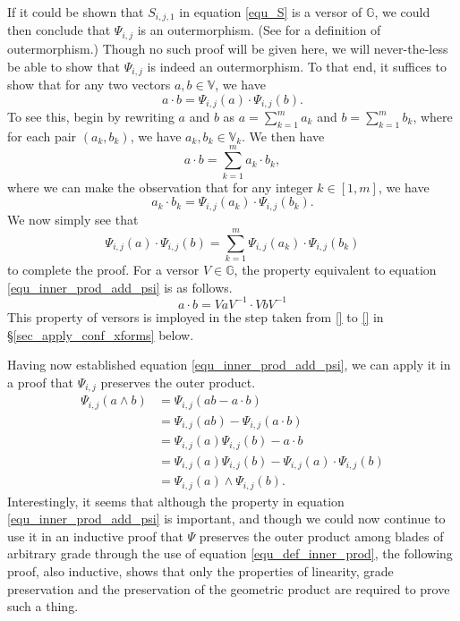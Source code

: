 \documentclass{ecgd-l}
\theoremstyle{definition}
\theoremstyle{remark}
\numberwithin{equation}{section}
\newcommand{\G}{\mathbb{G}}
\newcommand{\V}{\mathbb{V}}
\begin{document}
If it could be shown that $S_{i,j,1}$ in equation \eqref{equ_S} is a versor of $\G$,
we could then conclude that $\Psi_{i,j}$ is an outermorphism.
(See \cite{Hestenes91} for a definition of outermorphism.)  Though no such
proof will be given here, we will never-the-less be able to show that $\Psi_{i,j}$ is indeed
an outermorphism.  To that end, it suffices to show that
for any two vectors $a,b\in\V$, we have
\begin{equation}\label{equ_inner_prod_add_psi}
a\cdot b = \Psi_{i,j}(a)\cdot \Psi_{i,j}(b).
\end{equation}
To see this, begin by rewriting $a$ and $b$ as
$a = \sum_{k=1}^m a_k$ and $b = \sum_{k=1}^m b_k$,
where for each pair $(a_k,b_k)$, we have $a_k,b_k\in\V_k$.  We then have
\begin{equation*}
a\cdot b=\sum_{k=1}^m a_k\cdot b_k,
\end{equation*}
where we can make the observation that for any integer $k\in[1,m]$, we have
\begin{equation*}
a_k\cdot b_k = \Psi_{i,j}(a_k)\cdot\Psi_{i,j}(b_k).
\end{equation*}
We now simply see that
\begin{equation*}
\Psi_{i,j}(a)\cdot\Psi_{i,j}(b)=\sum_{k=1}^m\Psi_{i,j}(a_k)\cdot\Psi_{i,j}(b_k)
\end{equation*}
to complete the proof.  For a versor $V\in\G$, the property equivalent
to equation \eqref{equ_inner_prod_add_psi} is as follows.
\begin{equation*}
a\cdot b = VaV^{-1}\cdot VbV^{-1}
\end{equation*}
This property of versors is imployed in the step taken from \eqref{} to
\eqref{} in \S\ref{sec_apply_conf_xforms} below.

Having now established equation \eqref{equ_inner_prod_add_psi}, we can apply it in
a proof that $\Psi_{i,j}$ preserves the outer product.
\begin{align*}
\Psi_{i,j}(a\wedge b) &= \Psi_{i,j}(ab - a\cdot b) \\
 &= \Psi_{i,j}(ab) - \Psi_{i,j}(a\cdot b) \\
 &= \Psi_{i,j}(a)\Psi_{i,j}(b) - a\cdot b \\
 &= \Psi_{i,j}(a)\Psi_{i,j}(b) - \Psi_{i,j}(a)\cdot\Psi_{i,j}(b) \\
 &= \Psi_{i,j}(a)\wedge\Psi_{i,j}(b).
\end{align*}
Interestingly, it seems that although the property in equation
\eqref{equ_inner_prod_add_psi} is important, and though we
could now continue to use it in an inductive proof that $\Psi$
preserves the outer product among blades of arbitrary grade
through the use of equation \eqref{equ_def_inner_prod},
the following proof, also inductive, shows that only the properties
of linearity, grade preservation and the preservation of the geometric product
are required to prove such a thing.
\end{document}
